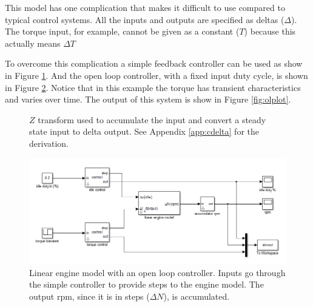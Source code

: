 \documentclass{article}
\begin{document}
This model has one complication that makes it difficult to use compared
to typical control systems.
All the inputs and outputs are specified as deltas ($\Delta$).
The torque input, for example, cannot be given as a constant ($T$) because this
actually means $\Delta T$

To overcome this complication a simple feedback controller can be used
as show in Figure \ref{fig:scont}.
And the open loop controller, with a fixed input duty cycle, is shown
in Figure \ref{fig:openloop}.
Notice that in this example the torque has transient characteristics and
varies over time.
The output of this system is show in Figure \ref{fig:olplot}.

\clearpage
\begin{figure}[!htbp]
\begin{center}



\end{center}
\caption{$Z$ transform used to accumulate the input and convert
a steady state input to delta output.
See Appendix \ref{app:cdelta} for the derivation.}
\label{fig:scont}
\end{figure}

\begin{figure}[!htbp]
\begin{center}
\includegraphics[scale=0.5]{img/schematic-no_control-ed1}
\end{center}
\caption{Linear engine model with an open loop controller.
Inputs go through the simple controller to provide steps to the
engine model.
The output rpm, since it is in steps ($\Delta N$), is accumulated.}
\label{fig:openloop}
\end{figure}
\end{document}
